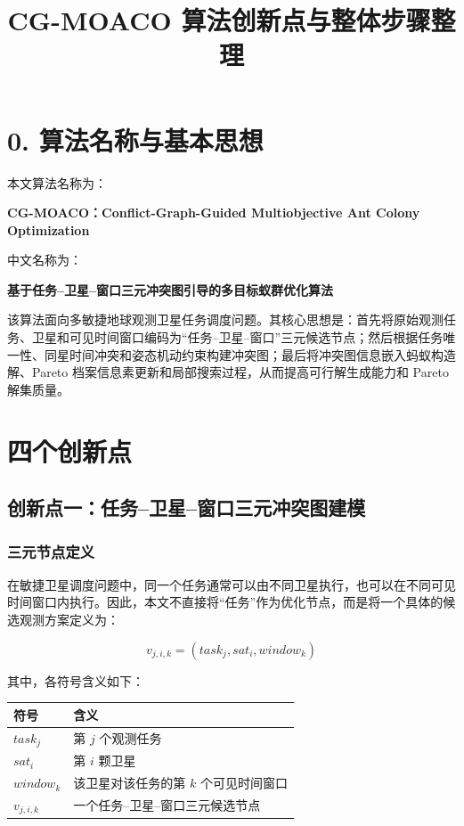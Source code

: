 \documentclass[UTF8,a4paper,12pt]{ctexart}
\title{\textbf{CG-MOACO 算法创新点与整体步骤整理}}
\author{}
\date{}
\begin{document}
\maketitle

\section*{0. 算法名称与基本思想}

本文算法名称为：

\begin{center}
\textbf{CG-MOACO：Conflict-Graph-Guided Multiobjective Ant Colony Optimization}
\end{center}

中文名称为：

\begin{center}
\textbf{基于任务--卫星--窗口三元冲突图引导的多目标蚁群优化算法}
\end{center}

该算法面向多敏捷地球观测卫星任务调度问题。其核心思想是：首先将原始观测任务、卫星和可见时间窗口编码为``任务--卫星--窗口''三元候选节点；然后根据任务唯一性、同星时间冲突和姿态机动约束构建冲突图；最后将冲突图信息嵌入蚂蚁构造解、Pareto 档案信息素更新和局部搜索过程，从而提高可行解生成能力和 Pareto 解集质量。

\newpage

\section{四个创新点}

\subsection{创新点一：任务--卫星--窗口三元冲突图建模}

\subsubsection{三元节点定义}

在敏捷卫星调度问题中，同一个任务通常可以由不同卫星执行，也可以在不同可见时间窗口内执行。因此，本文不直接将``任务''作为优化节点，而是将一个具体的候选观测方案定义为：

\begin{equation}
v_{j,i,k}=(task_j,sat_i,window_k)
\end{equation}

其中，各符号含义如下：

\begin{center}
\begin{tabular}{ll}
\toprule
符号 & 含义 \\
\midrule
$task_j$ & 第 $j$ 个观测任务 \\
$sat_i$ & 第 $i$ 颗卫星 \\
$window_k$ & 该卫星对该任务的第 $k$ 个可见时间窗口 \\
$v_{j,i,k}$ & 一个任务--卫星--窗口三元候选节点 \\
\bottomrule
\end{tabular}
\end{center}
\end{document}
